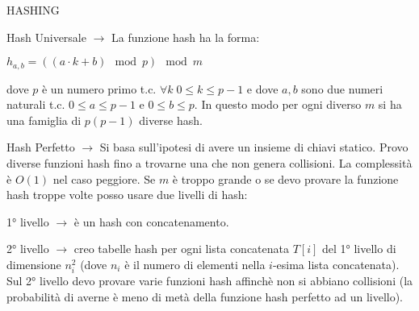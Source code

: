 \documentclass[8pt]{extarticle}
\begin{document}
\begin{formulario}
\begin{myParagraph}{HASHING}
\begin{descr}{0}
\begin{descr}{0}
\begin{descr}{0}
								\item[Hash Universale] $\rightarrow$  La funzione hash ha la forma:
									\begin{tcenter}
										$h_{a,b}=((a\cdot k+b)\mod p)\mod m$
									\end{tcenter}
dove $p$ è un numero primo t.c. $\forall k \; 0\leq k\leq p-1$ e dove $a,b$ sono due numeri naturali t.c. $0\leq a\leq p-1 \text{ e }0\leq b\leq p$. In questo modo per ogni diverso $m$ si ha una famiglia di $p(p-1)$ diverse hash.
								\item[Hash Perfetto] $\rightarrow$ Si basa sull'ipotesi di avere un insieme di chiavi statico. Provo diverse funzioni hash fino a trovarne una che non genera collisioni. La complessità è $O(1)$ nel caso peggiore. Se $m$ è troppo grande o se devo provare la funzione hash troppe volte posso usare due livelli di hash:				
							\begin{descr}{0}
								\item[1° livello] $\rightarrow$ è un hash con concatenamento.
								\item[2° livello] $\rightarrow$ creo tabelle hash per ogni lista concatenata $T[i]$ del 1° livello di dimensione $n_i^2$ (dove $n_i$ è il numero di elementi nella $i$-esima lista concatenata). Sul 2° livello devo provare varie funzioni hash affinchè non si abbiano collisioni (la probabilità di averne è meno di metà della funzione hash perfetto ad un livello). 
							\end{descr}
						\end{descr}
					\end{descr}
			\end{descr}
		\end{myParagraph}


\end{formulario}
\end{document}
